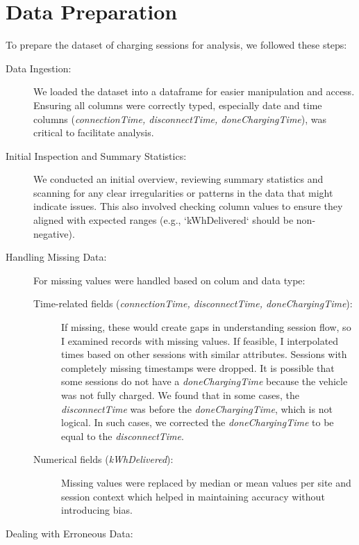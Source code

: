 \section{Data Preparation}

To prepare the dataset of charging sessions for analysis, we followed these steps:
\begin{description}
    \item[Data Ingestion:]
        We loaded the dataset into a dataframe for easier manipulation and access.
        Ensuring all columns were correctly typed, especially date and time columns
        (\textit{connectionTime, disconnectTime, doneChargingTime}), was critical to facilitate analysis.
    \item[Initial Inspection and Summary Statistics:]
        We conducted an initial overview, reviewing summary statistics and scanning for any clear irregularities or patterns in the data that might indicate issues.
        This also involved checking column values to ensure they aligned with expected ranges (e.g., `kWhDelivered` should be non-negative).
    \item[Handling Missing Data:]
        For missing values were handled based on colum and data type:
        \begin{description}
            \item[Time-related fields (\textit{connectionTime, disconnectTime, doneChargingTime}):]
                If missing, these would create gaps in understanding session flow, so I examined records with missing values.
                If feasible, I interpolated times based on other sessions with similar attributes.
                Sessions with completely missing timestamps were dropped.
                It is possible that some sessions do not have a \textit{doneChargingTime} because the vehicle was not fully charged.
                We found that in some cases, the \textit{disconnectTime} was before the \textit{doneChargingTime}, which is not logical.
                In such cases, we corrected the \textit{doneChargingTime} to be equal to the \textit{disconnectTime}.
            \item[Numerical fields (\textit{kWhDelivered}):]
                    Missing values were replaced by median or mean values per site and session context which helped in maintaining accuracy without introducing bias.
       \end{description}
    \item[Dealing with Erroneous Data:]

\end{description}
